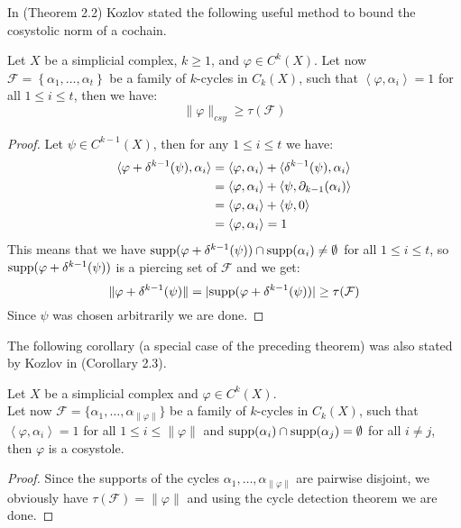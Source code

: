 In \cite{6} (Theorem 2.2) Kozlov stated the following useful method to bound the cosystolic norm of a cochain.

\begin{thm}\label{theorem9}
Let \(X\) be a simplicial complex, \(k\geq 1\), and \(\varphi\in C^k(X)\). Let now \(\mathcal{F}=\left\{\alpha_1,\ldots,\alpha_t\right\}\) be a family of \(k\)-cycles in \(C_k(X)\), such that \(\left\langle\varphi,\alpha_i\right\rangle=1\) for all \(1\leq i\leq t\), then we have:
\[
\|\varphi\|_{csy}\geq\tau(\mathcal{F})
\]
\begin{proof}
Let \(\psi\in C^{k-1}(X)\), then for any \(1\leq i\leq t\) we have:
\begin{align}
\langle\varphi+\delta^{k-1}(\psi),\alpha_i\rangle&=\langle\varphi,\alpha_i\rangle+\langle\delta^{k-1}(\psi),\alpha_i\rangle\notag\\
&=\langle\varphi,\alpha_i\rangle+\langle\psi,\partial_{k-1}(\alpha_i)\rangle\notag\\
&=\langle\varphi,\alpha_i\rangle+\langle\psi,0\rangle\notag\\
&=\langle\varphi,\alpha_i\rangle=1\notag
\end{align}
This means that we have \(\mathrm{supp}(\varphi+\delta^{k-1}(\psi))\cap \mathrm{supp}(\alpha_i)\neq\emptyset\) for all \(1\leq i\leq t\), so \(\mathrm{supp}(\varphi+\delta^{k-1}(\psi))\) is a piercing set of \(\mathcal{F}\) and we get:
\[
\|\varphi+\delta^{k-1}(\psi)\|=|\mathrm{supp}(\varphi+\delta^{k-1}(\psi))|\geq\tau(\mathcal{F})
\]
Since \(\psi\) was chosen arbitrarily we are done.
\end{proof}
\end{thm}

The following corollary (a special case of the preceding theorem) was also stated by Kozlov in \cite{6} (Corollary 2.3).

\begin{cor}\label{corollary1}
Let \(X\) be a simplicial complex and \(\varphi\in C^k(X)\).\\
Let now \(\mathcal{F}=\{\alpha_1,\ldots,\alpha_{\|\varphi\|}\}\) be a family of \(k\)-cycles in \(C_k(X)\), such that \(\left\langle\varphi,\alpha_i\right\rangle=1\) for all \(1\leq i\leq\|\varphi\|\) and \(\mathrm{supp}(\alpha_i)\cap \mathrm{supp}(\alpha_j)=\emptyset\) for all \(i\neq j\), then \(\varphi\) is a cosystole.
\begin{proof}
Since the supports of the cycles \(\alpha_1,\ldots,\alpha_{\|\varphi\|}\) are pairwise disjoint, we obviously have \(\tau(\mathcal{F})=\|\varphi\|\) and using the cycle detection theorem we are done.
\end{proof}
\end{cor}

